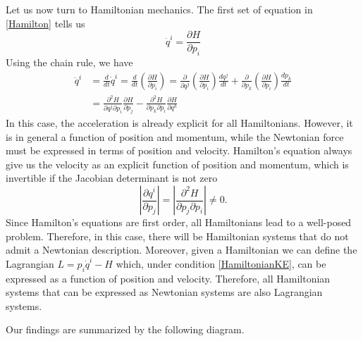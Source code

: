 \documentclass[11pt]{article}
\begin{document}
Let us now turn to Hamiltonian mechanics. The first set of equation in \eqref{Hamilton} tells us
\begin{equation*}
	\dot{q}^i = \frac{\partial H}{\partial p_i}
\end{equation*}
Using the chain rule, we have
\begin{align*}
	\ddot{q}^i &= \frac{d}{dt} \dot{q}^i  = \frac{d}{dt} \left( \frac{\partial H}{\partial p_i} \right) =  \frac{\partial}{\partial q^j} \left( \frac{\partial H}{\partial p_i} \right) \frac{dq^j}{dt} + \frac{\partial}{\partial p_k} \left( \frac{\partial H}{\partial p_i} \right) \frac{dp_k}{dt} \\
	&= \frac{\partial^2 H}{\partial q^j \partial p_i} \frac{\partial H}{\partial p_j} - \frac{\partial^2 H}{\partial p_k \partial p_i} \frac{\partial H}{\partial q^k}
\end{align*}
In this case, the acceleration is already explicit for all Hamiltonians. However, it is in general a function of position and momentum, while the Newtonian force must be expressed in terms of position and velocity. Hamilton's equation always give us the velocity as an explicit function of position and momentum, which is invertible if the Jacobian determinant is not zero
\begin{equation}\label{HamiltonianKE}
	\left| \frac{\partial q^i}{\partial p_j} \right| = \left| \frac{\partial^2 H}{\partial p_j \partial p_i} \right| \neq 0.
\end{equation}
Since Hamilton's equations are first order, all Hamiltonians lead to a well-posed problem. Therefore, in this case, there will be Hamiltonian systems that do not admit a Newtonian description. Moreover, given a Hamiltonian we can define the Lagrangian $L=p_i \dot{q}^i - H$ which, under condition \eqref{HamiltonianKE}, can be expressed as a function of position and velocity. Therefore, all Hamiltonian systems that can be expressed as Newtonian systems are also Lagrangian systems.

Our findings are summarized by the following diagram.

\begin{center}
\end{center}
\end{document}
